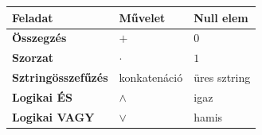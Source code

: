 \begin{tabularx}{\textwidth}{>{\bfseries}lXX}
Feladat & Művelet & Null elem \\
\midrule
Összegzés & $+$ & $0$ \\
Szorzat & $\cdot$ & $1$ \\
Sztringösszefűzés & konkatenáció & üres sztring \\
Logikai ÉS & $\land$ & igaz \\
Logikai VAGY & $\lor$ & hamis \\
\end{tabularx}
